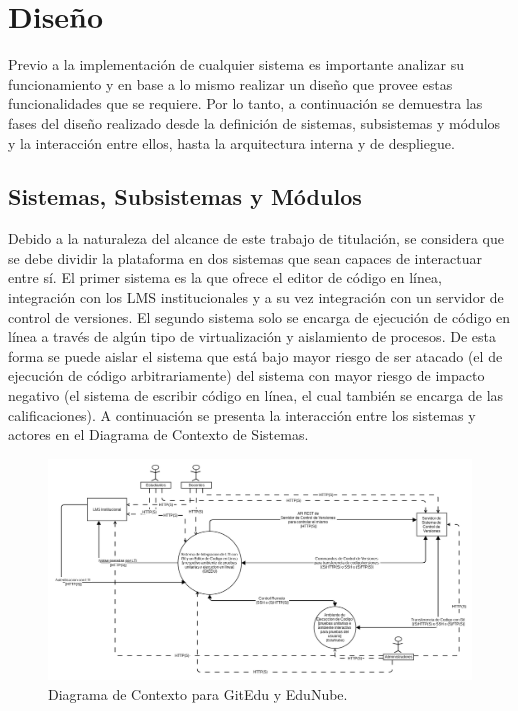 \section{Diseño}
Previo a la implementación de cualquier sistema es importante analizar su funcionamiento y en base a lo mismo realizar un diseño que provee estas funcionalidades que se requiere. Por lo tanto, a continuación se demuestra las fases del diseño realizado desde la definición de sistemas, subsistemas y módulos y la interacción entre ellos, hasta la arquitectura interna y de despliegue.

\subsection{Sistemas, Subsistemas y Módulos}
      
Debido a la naturaleza del alcance de este trabajo de titulación, se considera que se debe dividir la plataforma en dos sistemas que sean capaces de interactuar entre sí. El primer sistema es la que ofrece el editor de código en línea, integración con los LMS  institucionales y a su vez integración con un servidor de control de versiones. El segundo sistema solo se encarga de ejecución de código en línea a través de algún tipo de virtualización y aislamiento de procesos. De esta forma se puede aislar el sistema que está bajo mayor riesgo de ser atacado (el de ejecución de código arbitrariamente) del sistema con mayor riesgo de impacto negativo (el sistema de escribir código en línea, el cual también se encarga de las calificaciones). A continuación se presenta la interacción entre los sistemas y actores en el Diagrama de Contexto de Sistemas.

\begin{landscape}

	\begin{figure}
	  \begin{center}
	    \includegraphics[width=1.7\textwidth]{Figures/contexto.png}
	  \end{center}
	  \caption{Diagrama de Contexto para GitEdu y EduNube.}
	  \label{context}
	\end{figure}

\end{landscape}


